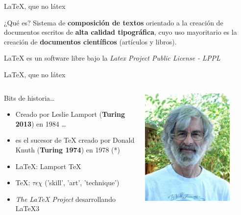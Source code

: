\begin{frame}{\LaTeX, que no látex}
    
    \begin{block}{¿Qué es?}
        Sistema de \textbf{composición de textos} orientado a la creación de documentos escritos de \textbf{alta calidad tipográfica}, cuyo uso mayoritario es la creación de \textbf{documentos científicos} (artículos y libros).

        \LaTeX{} es un software libre bajo la \textit{Latex Project Public License - LPPL}
    \end{block}
    
\end{frame}

\begin{frame}{\LaTeX, que no látex}
    \begin{columns}

        \begin{block}{Bits de historia\ldots{}}
            \begin{itemize}
                \item Creado por Leslie Lamport (\textbf{Turing 2013}) en 1984 \ldots{}
                \item es el sucesor de TeX creado por Donald Knuth (\textbf{Turing 1974}) en 1978 (*)
                \item \LaTeX{}: Lamport TeX
                \item TeX: $\tau\epsilon\chi$ ('skill', 'art', 'technique')
                \item \textit{The \LaTeX{} Project} desarrollando \LaTeX{}3 
            \end{itemize}
        \end{block}
        \pause
            \hspace{0.5cm}\includegraphics[width=0.8\textwidth]{images/leslie.jpg}
    \end{columns}


\end{frame}
